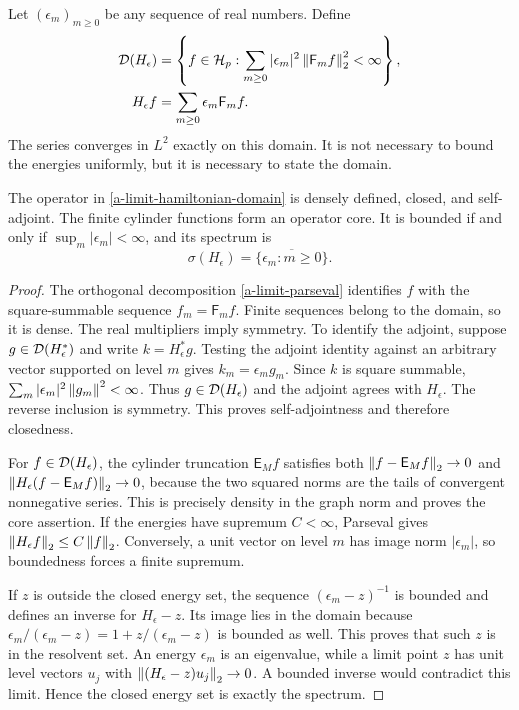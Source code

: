 Let $(\epsilon_m)_{m\geq0}$ be any sequence of real numbers. Define
\begin{align}
 \mathcal D(H_\epsilon)
 &=\left\{f\in\mathcal H_p:
 \sum_{m\geq0}|\epsilon_m|^2\left\lVert\mathsf F_mf\right\rVert_2^2<\infty\right\},
 \nonumber\\
 H_\epsilon f&=\sum_{m\geq0}\epsilon_m\mathsf F_mf.
 \label{a-limit-hamiltonian-domain}
\end{align}
The series converges in $L^2$ exactly on this domain. It is not necessary
to bound the energies uniformly, but it is necessary to state the domain.

\begin{theorem}
\label{a-limit-selfadjoint}
The operator in \eqref{a-limit-hamiltonian-domain} is densely defined,
closed, and self-adjoint. The finite cylinder functions form an operator
core. It is bounded if and only if $\sup_m|\epsilon_m|<\infty$, and its
spectrum is
\begin{equation}
 \sigma(H_\epsilon)=\overline{\{\epsilon_m:m\geq0\}}.
 \label{a-limit-spectrum}
\end{equation}
\end{theorem}
\begin{proof}
The orthogonal decomposition \eqref{a-limit-parseval} identifies $f$ with
the square-summable sequence $f_m=\mathsf F_mf$. Finite sequences belong
to the domain, so it is dense. The real multipliers imply symmetry.
To identify the adjoint, suppose $g\in\mathcal D(H_\epsilon^*)$ and write
$k=H_\epsilon^*g$. Testing the adjoint identity against an arbitrary
vector supported on level $m$ gives $k_m=\epsilon_m g_m$. Since $k$ is
square summable, $\sum_m|\epsilon_m|^2\left\lVert g_m\right\rVert^2<\infty$.
Thus $g\in\mathcal D(H_\epsilon)$ and the adjoint agrees with $H_\epsilon$.
The reverse inclusion is symmetry. This proves self-adjointness and
therefore closedness.

For $f\in\mathcal D(H_\epsilon)$, the cylinder truncation $\mathsf E_M f$
satisfies both
$\left\lVert f-\mathsf E_M f\right\rVert_2\to0$ and
$\left\lVert H_\epsilon(f-\mathsf E_M f)\right\rVert_2\to0$, because the two squared norms
are the tails of convergent nonnegative series. This is precisely density
in the graph norm and proves the core assertion.
If the energies have supremum $C<\infty$, Parseval gives
$\left\lVert H_\epsilon f\right\rVert_2\leq C\left\lVert f\right\rVert_2$. Conversely, a unit vector on
level $m$ has image norm $|\epsilon_m|$, so boundedness forces a finite
supremum.

If $z$ is outside the closed energy set, the sequence
$(\epsilon_m-z)^{-1}$ is bounded and defines an inverse for
$H_\epsilon-z$. Its image lies in the domain because
$\epsilon_m/(\epsilon_m-z)=1+z/(\epsilon_m-z)$ is bounded as well.
This proves that such $z$ is in the resolvent set. An energy
$\epsilon_m$ is an eigenvalue, while a limit point $z$ has unit level
vectors $u_j$ with $\left\lVert(H_\epsilon-z)u_j\right\rVert_2\to0$.
A bounded inverse would contradict this limit. Hence the closed energy
set is exactly the spectrum.
\end{proof}

